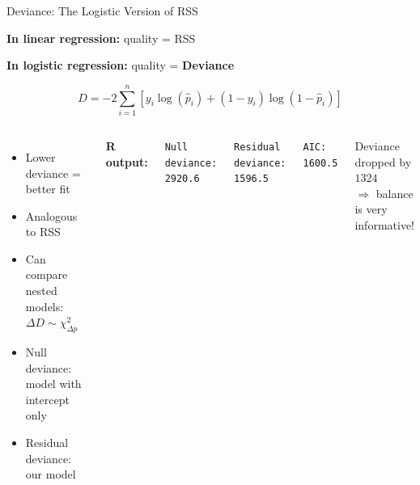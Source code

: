 \documentclass[aspectratio=169, 11pt]{beamer}
\begin{document}
\begin{frame}{Deviance: The Logistic Version of RSS}

\textbf{In linear regression:} quality = RSS

\textbf{In logistic regression:} quality = \textbf{Deviance}

$$D = -2 \sum_{i=1}^n \left[y_i \log(\hat{p}_i) + (1-y_i)\log(1-\hat{p}_i)\right]$$

\begin{columns}
\begin{itemize}
  \item Lower deviance = better fit
  \item Analogous to RSS
  \item Can compare nested models:\\
    $\Delta D \sim \chi^2_{\Delta p}$
  \item Null deviance: model with intercept only
  \item Residual deviance: our model
\end{itemize}

\textbf{R output:}

\vspace{0.3em}
\footnotesize\texttt{Null deviance: 2920.6}

\texttt{Residual deviance: 1596.5}

\texttt{AIC: 1600.5}
\normalsize

\vspace{0.3em}
Deviance dropped by $1324$\\
$\Rightarrow$ balance is very informative!
\end{columns}
\end{frame}
\end{document}
